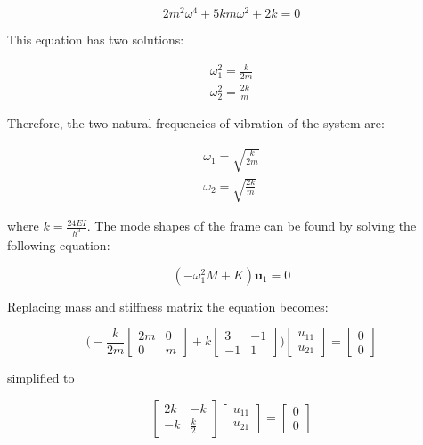 \documentclass[12pt,letter]{article}
\begin{document}
\begin{example}
\begin{equation}
2m^2 \omega^4 + 5 k m \omega^2 + 2 k = 0
\end{equation}

\noindent This equation has two solutions:

\begin{eqnarray}
\omega_1^2 = \frac{k}{2 m}\\
\omega_2^2 = \frac{2 k}{m}
\end{eqnarray}

\noindent Therefore, the two natural frequencies of vibration of the system are:

\begin{eqnarray}
\omega_1 = \sqrt{\frac{k}{2 m}}\\
\omega_2 = \sqrt{\frac{2 k}{m}}
\end{eqnarray}

\noindent where $k = \frac{24EI}{h^3}$. The mode shapes of the frame can be found by solving the following equation:

\begin{equation}
(-\omega_1^2 M  + K)\mathbf{u}_1 =0
\end{equation}

\noindent Replacing mass and stiffness matrix the equation becomes:

\begin{equation}
\bigg(-\frac{k}{2 m}\begin{bmatrix}  2m & 0 \\   0  & m \end{bmatrix} + k \begin{bmatrix} 3 & -1 \\    -1  & 1 \end{bmatrix}\bigg)\begin{bmatrix} u_{11}\\ u_{21}\end{bmatrix} = \begin{bmatrix} 0\\ 0\end{bmatrix}
\end{equation}

\noindent simplified to

\begin{equation}
\begin{bmatrix} 2k & -k \\    -k  & \frac{k}{2} \end{bmatrix} 
\begin{bmatrix} u_{11}\\ u_{21}\end{bmatrix}=\begin{bmatrix} 0\\ 0\end{bmatrix}
\end{equation}


\end{example}
\end{document}
